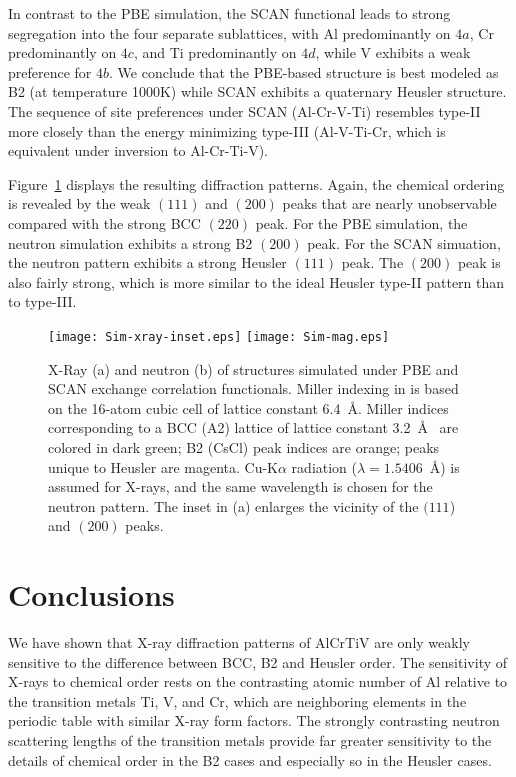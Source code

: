 \documentclass[twoside,12pt]{article}
\begin{document}
In contrast to the PBE simulation, the SCAN functional leads to strong segregation into the four separate sublattices, with Al predominantly on $4a$, Cr predominantly on $4c$, and Ti predominantly on $4d$, while V exhibits a weak preference for $4b$. We conclude that the PBE-based structure is best modeled as B2 (at temperature 1000K) while SCAN exhibits a quaternary Heusler structure. The sequence of site preferences under SCAN (Al-Cr-V-Ti) resembles type-II more closely than the energy minimizing type-III (Al-V-Ti-Cr, which is equivalent under inversion to Al-Cr-Ti-V).

Figure~\ref{fig:Sim} displays the resulting diffraction patterns. Again, the chemical ordering is revealed by the weak $(111)$ and $(200)$ peaks that are nearly unobservable compared with the strong BCC $(220)$ peak. For the PBE simulation, the neutron simulation exhibits a strong B2 $(200)$ peak. For the SCAN simuation, the neutron pattern exhibits a strong Heusler $(111)$ peak. The $(200)$ peak is also fairly strong, which is more similar to the ideal Heusler type-II pattern than to type-III.

\begin{figure}[h!]
\texttt{[image: Sim-xray-inset.eps]}
\texttt{[image: Sim-mag.eps]}
  \caption{\label{fig:Sim} X-Ray (a) and neutron (b) of structures simulated under PBE and SCAN exchange correlation functionals. Miller indexing in is based on the 16-atom cubic cell of lattice constant 6.4~\AA. Miller indices corresponding to a BCC (A2) lattice of lattice constant 3.2~\AA~ are colored in dark green; B2 (CsCl) peak indices are orange; peaks unique to Heusler are magenta. Cu-K$\alpha$ radiation ($\lambda=1.5406$~\AA) is assumed for X-rays, and the same wavelength is chosen for the neutron pattern. The inset in (a) enlarges the vicinity of the $(111$) and $(200)$ peaks.}
\end{figure}


\section{Conclusions}
\label{sec:conclude}
We have shown that X-ray diffraction patterns of AlCrTiV are only weakly sensitive to the difference between BCC, B2 and Heusler order. The sensitivity of X-rays to chemical order rests on the contrasting atomic number of Al relative to the transition metals Ti, V, and Cr, which are neighboring elements in the periodic table with similar X-ray form factors. The strongly contrasting neutron scattering lengths of the transition metals provide far greater sensitivity to the details of chemical order in the B2 cases and especially so in the Heusler cases.
\end{document}
